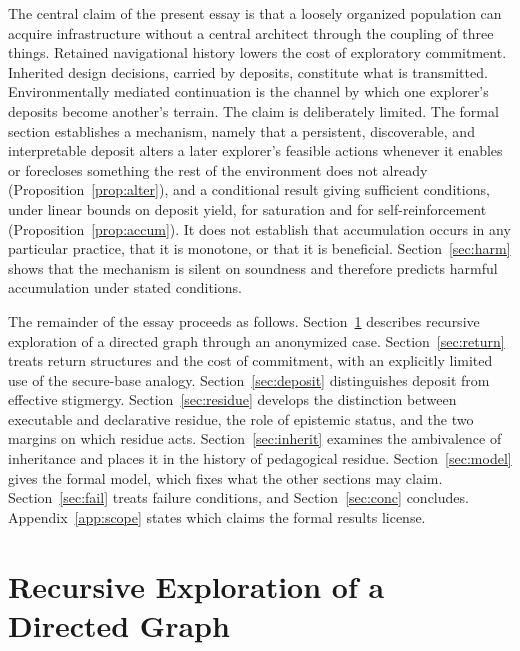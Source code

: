 \documentclass[11pt]{article}
\theoremstyle{definition}
\theoremstyle{remark}
\begin{document}
The central claim of the present essay is that a loosely organized population can acquire infrastructure without a central architect through the coupling of three things. Retained navigational history lowers the cost of exploratory commitment. Inherited design decisions, carried by deposits, constitute what is transmitted. Environmentally mediated continuation is the channel by which one explorer's deposits become another's terrain. The claim is deliberately limited. The formal section establishes a mechanism, namely that a persistent, discoverable, and interpretable deposit alters a later explorer's feasible actions whenever it enables or forecloses something the rest of the environment does not already (Proposition~\ref{prop:alter}), and a conditional result giving sufficient conditions, under linear bounds on deposit yield, for saturation and for self-reinforcement (Proposition~\ref{prop:accum}). It does not establish that accumulation occurs in any particular practice, that it is monotone, or that it is beneficial. Section~\ref{sec:harm} shows that the mechanism is silent on soundness and therefore predicts harmful accumulation under stated conditions.

The remainder of the essay proceeds as follows. Section~\ref{sec:graph} describes recursive exploration of a directed graph through an anonymized case. Section~\ref{sec:return} treats return structures and the cost of commitment, with an explicitly limited use of the secure-base analogy. Section~\ref{sec:deposit} distinguishes deposit from effective stigmergy. Section~\ref{sec:residue} develops the distinction between executable and declarative residue, the role of epistemic status, and the two margins on which residue acts. Section~\ref{sec:inherit} examines the ambivalence of inheritance and places it in the history of pedagogical residue. Section~\ref{sec:model} gives the formal model, which fixes what the other sections may claim. Section~\ref{sec:fail} treats failure conditions, and Section~\ref{sec:conc} concludes. Appendix~\ref{app:scope} states which claims the formal results license.

\section{Recursive Exploration of a Directed Graph}\label{sec:graph}
\end{document}
